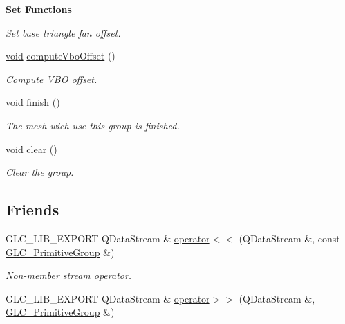 \begin{Indent}{\bf Set Functions}
\begin{DoxyCompactItemize}
\begin{DoxyCompactList}\small\item\em Set base triangle fan offset. \end{DoxyCompactList}\item 
\hyperlink{group___u_a_v_objects_plugin_ga444cf2ff3f0ecbe028adce838d373f5c}{void} \hyperlink{class_g_l_c___primitive_group_ae299584d307a4c07801829f0122ae481}{compute\-Vbo\-Offset} ()
\begin{DoxyCompactList}\small\item\em Compute V\-B\-O offset. \end{DoxyCompactList}\item 
\hyperlink{group___u_a_v_objects_plugin_ga444cf2ff3f0ecbe028adce838d373f5c}{void} \hyperlink{class_g_l_c___primitive_group_af2c7486a8344a7b5c37482bddf6ad7f4}{finish} ()
\begin{DoxyCompactList}\small\item\em The mesh wich use this group is finished. \end{DoxyCompactList}\item 
\hyperlink{group___u_a_v_objects_plugin_ga444cf2ff3f0ecbe028adce838d373f5c}{void} \hyperlink{class_g_l_c___primitive_group_a8969960a0cc276a78e620ac892933fb5}{clear} ()
\begin{DoxyCompactList}\small\item\em Clear the group. \end{DoxyCompactList}\end{DoxyCompactItemize}
\end{Indent}
\subsection*{Friends}
\begin{DoxyCompactItemize}
\item 
G\-L\-C\-\_\-\-L\-I\-B\-\_\-\-E\-X\-P\-O\-R\-T Q\-Data\-Stream \& \hyperlink{class_g_l_c___primitive_group_a6cf43d0f4875a11a4de1c4486f2da015}{operator$<$$<$} (Q\-Data\-Stream \&, const \hyperlink{class_g_l_c___primitive_group}{G\-L\-C\-\_\-\-Primitive\-Group} \&)
\begin{DoxyCompactList}\small\item\em Non-\/member stream operator. \end{DoxyCompactList}\item 
G\-L\-C\-\_\-\-L\-I\-B\-\_\-\-E\-X\-P\-O\-R\-T Q\-Data\-Stream \& \hyperlink{class_g_l_c___primitive_group_a9a4f421548048f64775eac1f4fa4cc2b}{operator$>$$>$} (Q\-Data\-Stream \&, \hyperlink{class_g_l_c___primitive_group}{G\-L\-C\-\_\-\-Primitive\-Group} \&)
\end{DoxyCompactItemize}
